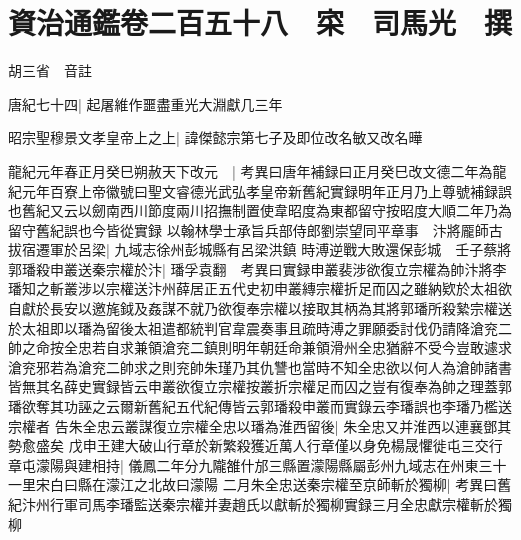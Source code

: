 \chapter{資治通鑑卷二百五十八　寀　司馬光　撰}

胡三省　音註

唐紀七十四|{
	起屠維作噩盡重光大淵獻几三年}


昭宗聖穆景文孝皇帝上之上|{
	諱傑懿宗第七子及即位改名敏又改名曄}


龍紀元年春正月癸巳朔赦天下改元　|{
	考異曰唐年補録曰正月癸巳改文德二年為龍紀元年百寮上帝徽號曰聖文睿德光武弘孝皇帝新舊紀實録明年正月乃上尊號補録誤也舊紀又云以劒南西川節度兩川招撫制置使韋昭度為東都留守按昭度大順二年乃為留守舊紀誤也今皆從實録}
以翰林學士承旨兵部侍郎劉崇望同平章事　汴將龎師古拔宿遷軍於呂梁|{
	九域志徐州彭城縣有呂梁洪鎮}
時溥逆戰大敗還保彭城　壬子蔡將郭璠殺申叢送秦宗權於汴|{
	璠孚袁翻　考異曰實録申叢裴涉欲復立宗權為帥汴將李璠知之斬叢涉以宗權送汴州薛居正五代史初申叢縳宗權折足而囚之雖納欵於太祖欲自獻於長安以邀旄鉞及姦謀不就乃欲復奉宗權以接取其柄為其將郭璠所殺縶宗權送於太祖即以璠為留後太祖遣都統判官韋震奏事且疏時溥之罪願委討伐仍請降滄兖二帥之命按全忠若自求兼領滄兖二鎮則明年朝廷命兼領滑州全忠猶辭不受今豈敢遽求滄兖邪若為滄兖二帥求之則兖帥朱瑾乃其仇讐也當時不知全忠欲以何人為滄帥諸書皆無其名薛史實録皆云申叢欲復立宗權按叢折宗權足而囚之豈有復奉為帥之理蓋郭璠欲奪其功誣之云爾新舊紀五代紀傳皆云郭璠殺申叢而實錄云李璠誤也李璠乃檻送宗權者}
告朱全忠云叢謀復立宗權全忠以璠為淮西留後|{
	朱全忠又并淮西以連襄鄧其勢愈盛矣}
戊申王建大破山行章於新繁殺獲近萬人行章僅以身免楊晟懼徙屯三交行章屯濛陽與建相持|{
	儀鳳二年分九隴雒什邡三縣置濛陽縣屬彭州九域志在州東三十一里宋白曰縣在濛江之北故曰濛陽}
二月朱全忠送秦宗權至京師斬於獨柳|{
	考異曰舊紀汴州行軍司馬李璠監送秦宗權并妻趙氏以獻斬於獨柳實録三月全忠獻宗權斬於獨柳}


